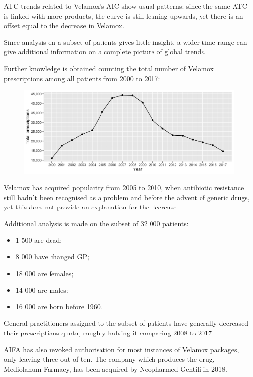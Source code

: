 ATC trends related to Velamox's AIC show usual patterns: since the same ATC is linked with more products, the curve is still leaning upwards, yet there is an offset equal to the decrease in Velamox.

Since analysis on a subset of patients gives little insight, a wider time range can give additional information on a complete picture of global trends. 

Further knowledge is obtained counting the total number of Velamox prescriptions among all patients from 2000 to 2017:

\begin{figure}[h]
	\centering
	\includegraphics[scale=0.3]{../plots/velamox-year.png}
\end{figure}

Velamox has acquired popularity from 2005 to 2010, when antibiotic resistance still hadn't been recognised as a problem and before the advent of generic drugs, yet this does not provide an explanation for the decrease.

Additional analysis is made on the subset of 32 000 patients:
\begin{itemize}
	\item 1 500 are dead;
	\item 8 000 have changed GP;
	\item 18 000 are females;
	\item 14 000 are males;
	\item 16 000 are born before 1960.
\end{itemize}

General practitioners assigned to the subset of patients have generally decreased their prescriptions quota, roughly halving it comparing 2008 to 2017.

AIFA has also revoked authorisation for most instances of Velamox packages, only leaving three out of ten. The company which produces the drug, Mediolanum Farmacy, has been acquired by Neopharmed Gentili in 2018.

